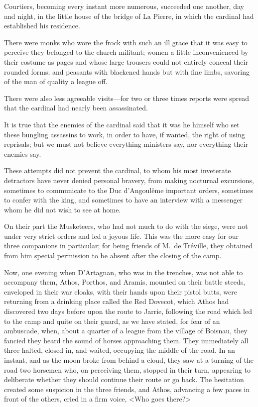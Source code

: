 Courtiers, becoming every instant more numerous, succeeded one another, day and night, in the little house of the bridge of La Pierre, in which the cardinal had established his residence. 

There were monks who wore the frock with such an ill grace that it was easy to perceive they belonged to the church militant; women a little inconvenienced by their costume as pages and whose large trousers could not entirely conceal their rounded forms; and peasants with blackened hands but with fine limbs, savoring of the man of quality a league off. 

There were also less agreeable visits—for two or three times reports were spread that the cardinal had nearly been assassinated. 

It is true that the enemies of the cardinal said that it was he himself who set these bungling assassins to work, in order to have, if wanted, the right of using reprisals; but we must not believe everything ministers say, nor everything their enemies say. 

These attempts did not prevent the cardinal, to whom his most inveterate detractors have never denied personal bravery, from making nocturnal excursions, sometimes to communicate to the Duc d'Angoulême important orders, sometimes to confer with the king, and sometimes to have an interview with a messenger whom he did not wish to see at home. 

On their part the Musketeers, who had not much to do with the siege, were not under very strict orders and led a joyous life. This was the more easy for our three companions in particular; for being friends of M.~de Tréville, they obtained from him special permission to be absent after the closing of the camp. 

Now, one evening when D'Artagnan, who was in the trenches, was not able to accompany them, Athos, Porthos, and Aramis, mounted on their battle steeds, enveloped in their war cloaks, with their hands upon their pistol butts, were returning from a drinking place called the Red Dovecot, which Athos had discovered two days before upon the route to Jarrie, following the road which led to the camp and quite on their guard, as we have stated, for fear of an ambuscade, when, about a quarter of a league from the village of Boisnau, they fancied they heard the sound of horses approaching them. They immediately all three halted, closed in, and waited, occupying the middle of the road. In an instant, and as the moon broke from behind a cloud, they saw at a turning of the road two horsemen who, on perceiving them, stopped in their turn, appearing to deliberate whether they should continue their route or go back. The hesitation created some suspicion in the three friends, and Athos, advancing a few paces in front of the others, cried in a firm voice, <Who goes there?> 

